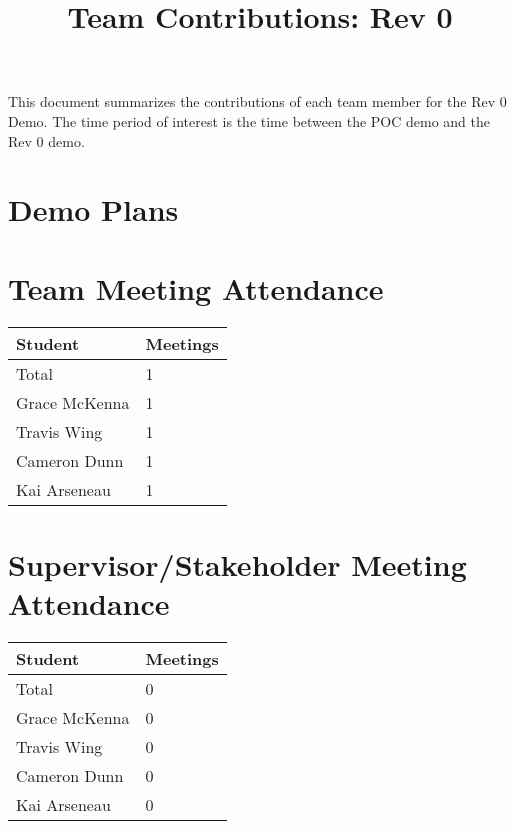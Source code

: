 \documentclass{article}
\title{Team Contributions: Rev 0\\\progname}
\author{\authname}
\date{}
\begin{document}
\maketitle

This document summarizes the contributions of each team member for the Rev 0
Demo.  The time period of interest is the time between the POC demo and the Rev
0 demo.

\section{Demo Plans}


\section{Team Meeting Attendance}



\begin{table}[H]
\centering
\begin{tabular}{ll}
\toprule
\textbf{Student} & \textbf{Meetings}\\
\midrule
Total & 1\\
Grace McKenna & 1\\
Travis Wing & 1\\
Cameron Dunn & 1\\
Kai Arseneau & 1\\
\bottomrule
\end{tabular}
\end{table}


\section{Supervisor/Stakeholder Meeting Attendance}

\begin{table}[H]
\centering
\begin{tabular}{ll}
\toprule
\textbf{Student} & \textbf{Meetings}\\
\midrule
Total & 0\\
Grace McKenna & 0\\
Travis Wing & 0\\
Cameron Dunn & 0\\
Kai Arseneau & 0\\
\bottomrule
\end{tabular}
\end{table}

\end{document}
